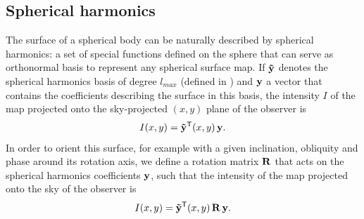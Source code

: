 \documentclass[modern]{aastex631}
\begin{document}
\subsection{Spherical harmonics}

The surface of a spherical body can be naturally described by spherical harmonics: a set of special functions defined on the sphere that can serve as orthonormal basis to represent any spherical surface map. If ${\mathbf{\tilde y}}$ denotes the spherical harmonics basis of degree $l_{max}$ (defined in \citealt[section X]{starry}) and ${\mathbf{y}}$ a vector that contains the coefficients describing the surface in this basis, the intensity $I$ of the map projected onto the sky-projected $(x, y)$ plane of the observer is
\begin{equation}I(x, y) = \bvec{\tilde y^\mathsf{T}}(x, y) \, \bvec{y}.\end{equation}
In order to orient this surface, for example with a given inclination, obliquity and phase around its rotation axis, we define a rotation matrix ${\mathbf{R}}$ that acts on the spherical harmonics coefficients ${\mathbf{y}}$, such that the intensity of the map projected onto the sky of the observer is
\begin{equation}I(x, y) = \bvec{\tilde y}^\mathsf{T}(x, y) \, \bvec{R} \, \bvec{y}.\end{equation}\\
\end{document}
